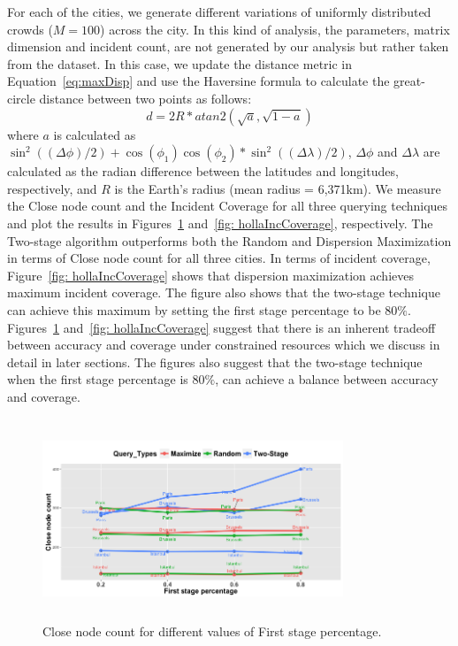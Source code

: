 \documentclass{acm_proc_article-sp}
\begin{document}
For each of the cities, we generate different variations of uniformly distributed crowds ($M = 100$) across the city. In this kind of analysis, the parameters, matrix dimension and incident count, are not generated by our analysis but rather taken from the dataset. In this case, we update the distance metric in Equation~\ref{eq:maxDisp} and use the Haversine formula to calculate the great-circle distance between two points as follows:
\begin{equation} \label{eq:maxDisp2}
d = 2R*atan2(\sqrt{a}, \sqrt{1-a})
\end{equation}
where $a$ is calculated as $ \sin ^2((\Delta \phi)/2 ) + \cos(\phi_1)\cos(\phi_2) * \sin ^2((\Delta \lambda)/2 )$, $\Delta \phi$ and $\Delta \lambda$ are calculated as the radian difference between the latitudes and longitudes, respectively, and $R$ is the Earth's radius (mean radius = 6,371km). We measure the Close node count and the Incident Coverage for all three querying techniques and plot the results in Figures~\ref{fig: hollaCloseCount} and~\ref{fig: hollaIncCoverage}, respectively. The Two-stage algorithm outperforms both the Random and Dispersion Maximization in terms of Close node count for all three cities. In terms of incident coverage, Figure~\ref{fig: hollaIncCoverage} shows that dispersion maximization achieves maximum incident coverage. The figure also shows that the two-stage technique can achieve this maximum by setting the first stage percentage to be $80\%$. Figures~\ref{fig: hollaCloseCount} and~\ref{fig: hollaIncCoverage} suggest that there is an inherent tradeoff between accuracy and coverage under constrained resources which we discuss in detail in later sections. The figures also suggest that the two-stage technique when the first stage percentage is $80\%$, can achieve a balance between accuracy and coverage.\par
\begin{figure}[!h]
\centering
\includegraphics[width=9cm ,height=6cm]{figuresPng/hollaCloseCnt.png}
\caption{Close node count for different values of First stage percentage. }
\label{fig: hollaCloseCount}
\end{figure}
\end{document}
